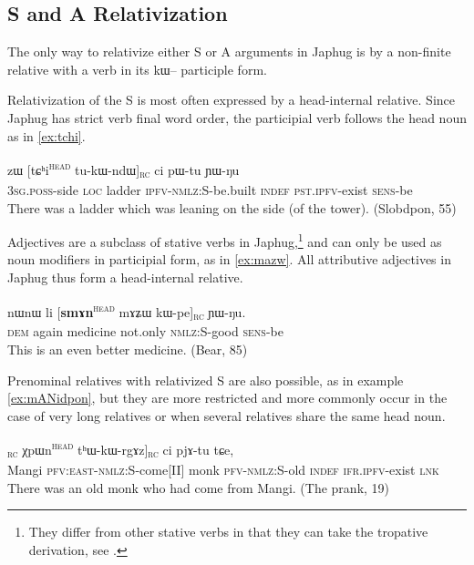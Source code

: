 \documentclass[oldfontcommands,oneside,a4paper,11pt]{article}
\newcommand{\ipa}[1]{{\phon #1}} %
\newcommand{\tete}{\textsuperscript{\textsc{head}}}
\newcommand{\rc}{\textsubscript{\textsc{rc}}}
\begin{document}
\subsection{S and A Relativization}
The only way to relativize either S or A arguments in Japhug is by a non-finite relative with a verb in its \ipa{kɯ--} participle form. 

Relativization of the S is most often expressed by a head-internal relative. Since Japhug has strict verb final word order,  the participial verb follows the head noun as in \ref{ex:tchi}.

 \begin{exe}
   \ex   \label{ex:tchi}
 \gll  	\ipa{ɯ-ɣmbɤj}  	\ipa{zɯ}  	[\ipa{tɕʰi}\tete{}  	\ipa{tu-kɯ-ndɯ}]\rc{}  	\ipa{ci}  	\ipa{pɯ-tu}  	\ipa{ɲɯ-ŋu}  		\\
\textsc{3sg.poss}-side \textsc{loc} ladder \textsc{ipfv-nmlz:S}-be.built  \textsc{indef} \textsc{pst.ipfv}-exist \textsc{sens}-be  \\
 \glt    There was a ladder which was leaning on the side (of the tower). (Slobdpon, 55)
   \end{exe} 

Adjectives are a subclass of stative verbs in Japhug,\footnote{They differ from other stative verbs in that they can take the tropative derivation, see \citet{jacques13tropative}. } and can only be used as noun modifiers in participial form, as in \ref{ex:mazw}. All attributive adjectives in Japhug thus form a head-internal relative.

 \begin{exe}
   \ex   \label{ex:mazw}
 \gll 
\ipa{nɯnɯ}  	\ipa{li}  	[\textbf{\ipa{smɤn}}\tete{}   	\ipa{mɤʑɯ}  	\ipa{kɯ-pe}]\rc{}  	\ipa{ɲɯ-ŋu.}  \\
\textsc{dem} again medicine not.only \textsc{nmlz:S}-good \textsc{sens}-be \\
 \glt    This is an even better medicine. (Bear, 85)
   \end{exe} 

Prenominal relatives with relativized S are also possible, as in example  \ref{ex:mANidpon}, but they are more restricted and more commonly occur in the case of very long relatives or when several relatives share the same head noun.

\begin{exe}
   \ex  \label{ex:mANidpon}
\gll [[\ipa{mɤŋi}  	\ipa{kɤ-kɯ-ɣe}]\rc{}  	\ipa{χpɯn}\tete{}  	\ipa{tʰɯ-kɯ-rgɤz}]\rc{}  	\ipa{ci}  	\ipa{pjɤ-tu}  	\ipa{tɕe,}    	\\
Mangi \textsc{pfv:east-nmlz:S}-come[II] monk \textsc{pfv-nmlz:S}-old \textsc{indef} \textsc{ifr.ipfv}-exist   \textsc{lnk} \\
 \glt  There was an old monk who had come from Mangi. (The prank, 19)
   \end{exe} 
\end{document}
